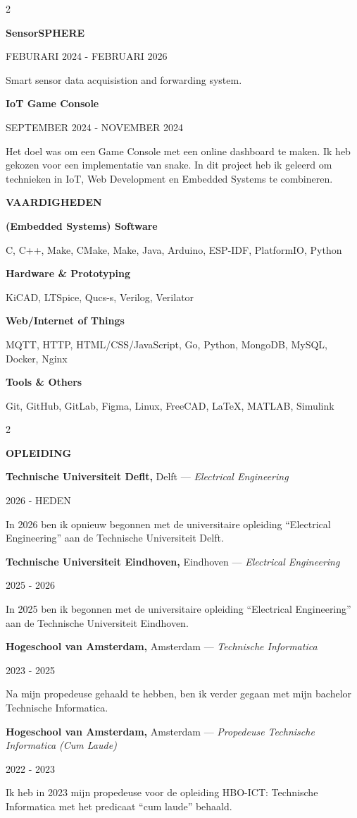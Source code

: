 \documentclass[10pt]{article}
\newcommand{\cvsection}[1]{%
  \vspace{18pt}%
  {\sffamily\bfseries\footnotesize\color{accent}\MakeUppercase{#1}\par}%
  \vspace{12pt}}
\newcommand{\cvproject}[3]{%
  {\raggedright\large\color{heading}\textbf{#1}\par}%
  \vspace{3pt}%
  {\sffamily\scriptsize\color{datetext}\MakeUppercase{#2}\par}%
  \vspace{3pt}%
  {\raggedright\small\color{bodytext}#3\par}%
  \vspace{12pt}}
\newcommand{\cventry}[5]{%
  {\raggedright\large\color{heading}\textbf{#1,} #2 --- \textit{#3}\par}%
  \vspace{3pt}%
  {\sffamily\scriptsize\color{datetext}\MakeUppercase{#4}\par}%
  \vspace{3pt}%
  {\raggedright\small\color{bodytext}#5\par}%
  \vspace{12pt}}
\newcommand{\skillgroup}[2]{%
  {\raggedright\small\bfseries\color{heading}#1\par}%
  \vspace{2pt}%
  {\raggedright\small\color{bodytext}#2\par}%
  \vspace{10pt}}
\newcommand{\skill}[1]{{\raggedright\small\color{bodytext}#1\par}\vspace{7pt}}
\begin{document}
\begin{paracol}{2}
\cvproject{SensorSPHERE}{Feburari 2024 - Februari 2026}
{Smart sensor data acquisistion and forwarding system.}

\cvproject{IoT Game Console}{September 2024 - November 2024}
{	Het doel was om een Game Console met een online dashboard te maken.
	Ik heb gekozen voor een implementatie van snake.
	In dit project heb ik geleerd om technieken in
	IoT, Web Development en Embedded Systems te combineren.
}

\switchcolumn
\vspace{24pt}
\cvsection{Vaardigheden}

\skillgroup{(Embedded Systems) Software}
  {C, C++, Make, CMake, Make, Java, Arduino, ESP-IDF, PlatformIO, Python}
\skillgroup{Hardware \& Prototyping}
  {KiCAD, LTSpice, Qucs-s, Verilog, Verilator}
\skillgroup{Web/Internet of Things}
  {MQTT, HTTP, HTML/CSS/JavaScript, Go, Python, MongoDB, MySQL, Docker, Nginx}
\skillgroup{Tools \& Others}
  {Git, GitHub, GitLab, Figma, Linux, FreeCAD, LaTeX, MATLAB, Simulink}


\end{paracol}

\clearpage
\begin{paracol}{2}
\cvsection{Opleiding}

\cventry{Technische Universiteit Deflt}{Delft}{Electrical Engineering}{2026 - Heden}
  {In 2026 ben ik opnieuw begonnen met de universitaire opleiding ``Electrical
   Engineering'' aan de Technische Universiteit Delft.}

\cventry{Technische Universiteit Eindhoven}{Eindhoven}{Electrical Engineering}{2025 - 2026}
  {In 2025 ben ik begonnen met de universitaire opleiding ``Electrical
   Engineering'' aan de Technische Universiteit Eindhoven.}

\cventry{Hogeschool van Amsterdam}{Amsterdam}{Technische Informatica}{2023 - 2025}
  {Na mijn propedeuse gehaald te hebben, ben ik verder gegaan met mijn
   bachelor Technische Informatica.}

\cventry{Hogeschool van Amsterdam}{Amsterdam}{Propedeuse Technische Informatica (Cum Laude)}{2022 - 2023}
  {Ik heb in 2023 mijn propedeuse voor de opleiding HBO-ICT: Technische
   Informatica met het predicaat ``cum laude'' behaald.}


\switchcolumn
\end{paracol}
\end{document}
